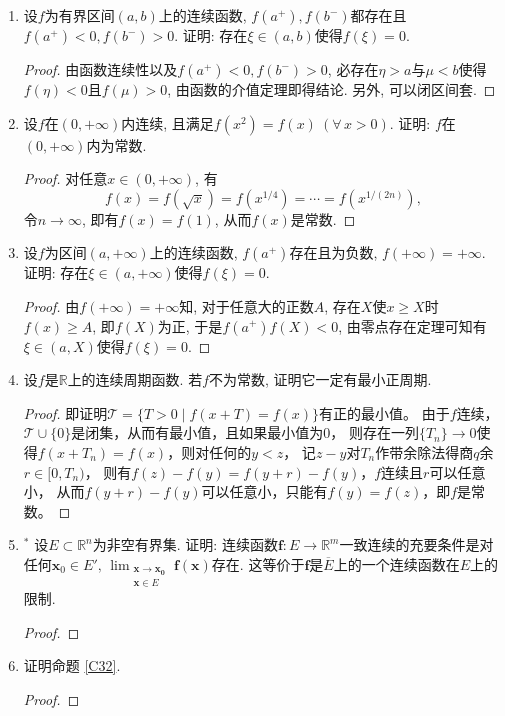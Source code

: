 \begin{3a}
\begin{enumerate}
\item 设\(f\)为有界区间\((a,b)\)上的连续函数, \(f(a^+),f(b^-)\)都存在且\(f(a^+)<0,f(b^-)>0\). 证明: 存在\(\xi\in (a,b)\)使得\(f(\xi)=0\).
\begin{proof}
由函数连续性以及\(f(a^+)<0,f(b^-)>0\), 必存在\(\eta>a\)与\(\mu<b\)使得\(f(\eta)<0\)且\(f(\mu)>0\), 由函数的介值定理即得结论. 另外, 可以闭区间套.
\end{proof}
\item 设\(f\)在\((0,+\infty)\)内连续, 且满足\(f(x^2)=f(x)\ (\forall\, x>0)\). 证明: \(f\)在\((0,+\infty)\)内为常数.
\begin{proof}
对任意\(x\in(0,+\infty)\), 有\[f(x)=f\left(\sqrt{x}\right)=f\left(x^{1/4}\right)=\cdots=f\left(x^{1/(2n)}\right),\]令\(n\rightarrow\infty\), 即有\(f(x)=f(1)\), 从而\(f(x)\)是常数.
\end{proof}
\item 设\(f\)为区间\((a,+\infty)\)上的连续函数, \(f(a^+)\)存在且为负数, \(f(+\infty)=+\infty\). 证明: 存在\(\xi\in(a,+\infty)\)使得\(f(\xi)=0\).
\begin{proof}
由\(f(+\infty)=+\infty\)知, 对于任意大的正数\(A\), 存在\(X\)使\(x\geqslant X\)时\(f(x)\geqslant A\), 即\(f(X)\)为正, 于是\(f(a^+)f(X)<0\), 由零点存在定理可知有\(\xi\in(a,X)\)使得\(f(\xi)=0\).
\end{proof}
\item 设\(f\)是\(\mathbb{R}\)上的连续周期函数. 若\(f\)不为常数, 证明它一定有最小正周期.
\begin{proof}
即证明$\mathscr{T}=\{T>0 \mid f(x+T)=f(x)\}$有正的最小值。
由于$f$连续，$\mathscr{T}\cup\{0\}$是闭集，从而有最小值，且如果最小值为$0$，
则存在一列$\{T_n\}\to0$使得$f(x+T_n)=f(x)$，则对任何的$y<z$，
记$z-y$对$T_n$作带余除法得商$q$余$r\in[0,T_n)$，
则有$f(z)-f(y)=f(y+r)-f(y)$，$f$连续且$r$可以任意小，
从而$f(y+r)-f(y)$可以任意小，只能有$f(y)=f(z)$，即$f$是常数。
\end{proof}
\item ${}^*$ 设\(E\subset\mathbb{R}^n\)为非空有界集. 证明: 连续函数\(\boldsymbol{f}:E\rightarrow\mathbb{R}^m\)一致连续的充要条件是对任何\(\boldsymbol{x}_0\in E',\,\lim_{\substack{\boldsymbol{x}\rightarrow\boldsymbol{x_0}\\\boldsymbol{x}\in E}}\boldsymbol{f}(\boldsymbol{x})\)存在. 这等价于\(\boldsymbol{f}\)是\(\overline{E}\)上的一个连续函数在\(E\)上的限制.
\begin{proof}

\end{proof}
\item 证明命题 \ref{C32}.
\begin{proof}
	

\end{proof}
\end{enumerate}
\end{3a}
